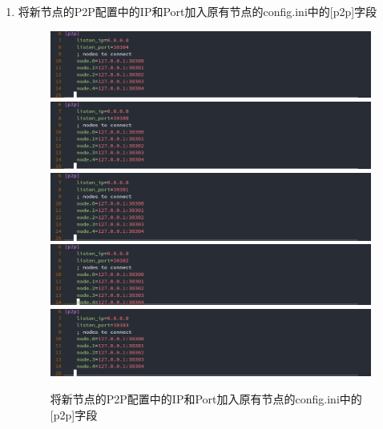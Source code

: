 \documentclass[a4paper, 11pt]{article}
\begin{document}
\begin{enumerate}
      \item 将新节点的P2P配置中的IP和Port加入原有节点的config.ini中的[p2p]字段
      \begin{figure}[H]
            \centering
            \includegraphics[width = 0.8 \textwidth]{newNodep2p.png}
            \includegraphics[width = 0.8 \textwidth]{node0p2p.png}
            \includegraphics[width = 0.8 \textwidth]{node1p2p.png}
            \includegraphics[width = 0.8 \textwidth]{node2p2p.png}
            \includegraphics[width = 0.8 \textwidth]{node3p2p.png}
            \caption{将新节点的P2P配置中的IP和Port加入原有节点的config.ini中的[p2p]字段}
      \end{figure}
\end{enumerate}
\end{document}
